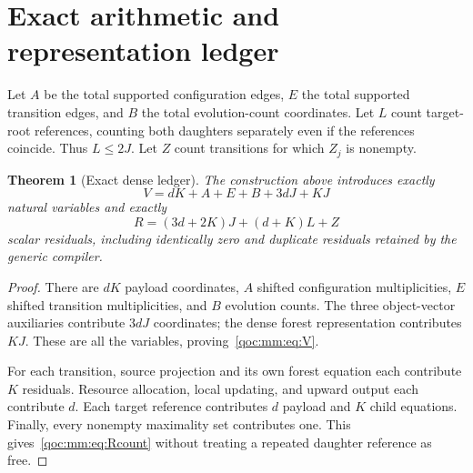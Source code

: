 \documentclass[11pt,letterpaper]{article}
\newtheorem{theorem}{Theorem}[section]
\theoremstyle{definition}
\theoremstyle{remark}
\begin{document}
\section{Exact arithmetic and representation ledger}\label{qoc:mm:sec:ledger}
Let $A$ be the total supported configuration edges, $E$ the total supported transition edges, and $B$ the total evolution-count coordinates. Let $L$ count target-root references, counting both daughters separately even if the references coincide. Thus $L\leq2J$. Let $Z$ count transitions for which $Z_j$ is nonempty.

\begin{theorem}[Exact dense ledger]\label{qoc:mm:thm:ledger}
The construction above introduces exactly
\begin{equation}\label{qoc:mm:eq:V}
 V=dK+A+E+B+3dJ+KJ
\end{equation}
natural variables and exactly
\begin{equation}\label{qoc:mm:eq:Rcount}
 R=(3d+2K)J+(d+K)L+Z
\end{equation}
scalar residuals, including identically zero and duplicate residuals retained by the generic compiler.
\end{theorem}
\begin{proof}
There are $dK$ payload coordinates, $A$ shifted configuration multiplicities, $E$ shifted transition multiplicities, and $B$ evolution counts. The three object-vector auxiliaries contribute $3dJ$ coordinates; the dense forest representation contributes $KJ$. These are all the variables, proving~\eqref{qoc:mm:eq:V}.

For each transition, source projection and its own forest equation each contribute $K$ residuals. Resource allocation, local updating, and upward output each contribute $d$. Each target reference contributes $d$ payload and $K$ child equations. Finally, every nonempty maximality set contributes one. This gives~\eqref{qoc:mm:eq:Rcount} without treating a repeated daughter reference as free.
\end{proof}
\end{document}
